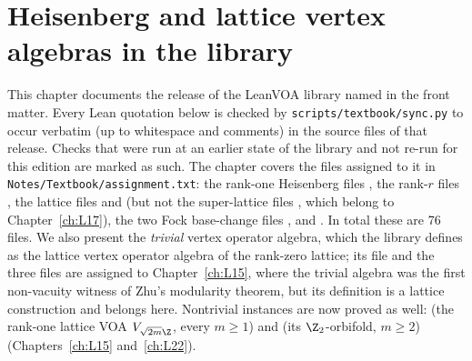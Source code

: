 \chapter{Heisenberg and lattice vertex algebras in the library}\label{ch:L05}
\begingroup\setlength{\emergencystretch}{3em}

\providecommand{\lfivevac}{\mathbf{1}}
\providecommand{\lfiveF}{\mathcal{F}}
\providecommand{\lfiveR}{\mathbb{R}}
\providecommand{\lfiveO}{O_2}
\providecommand{\lfiveA}{A_2}
\providecommand{\lfivesl}{\mathfrak{sl}_2}

This chapter documents the release of the LeanVOA library named in the front matter. Every Lean quotation below is checked by \texttt{scripts/textbook/sync.py}
to occur verbatim (up to whitespace and comments) in the source files of that release. Checks that were run at an earlier state of the library and not re-run for this edition are marked as such. The chapter covers the files assigned to it in
\texttt{Notes/Textbook/assignment.txt}: the rank-one Heisenberg files
, the rank-$r$ files
, the lattice files
 and
 (but not the super-lattice files
, which belong to Chapter~\ref{ch:L17}), the two Fock base-change files
, and
. In total these are 76 files.
We also present the \emph{trivial} vertex operator algebra, which the library defines as the lattice
vertex operator algebra of the rank-zero lattice; its file
 and the three
 files are assigned to Chapter~\ref{ch:L15}, where the trivial algebra was the
first non-vacuity witness of Zhu's modularity theorem, but its definition is a lattice construction and
belongs here. Nontrivial instances are now proved as well:  (the rank-one lattice
VOA $V_{\sqrt{2m}\Z}$, every $m\ge1$) and  (its $\Z_2$-orbifold, $m\ge2$)
(Chapters~\ref{ch:L15} and~\ref{ch:L22}).

